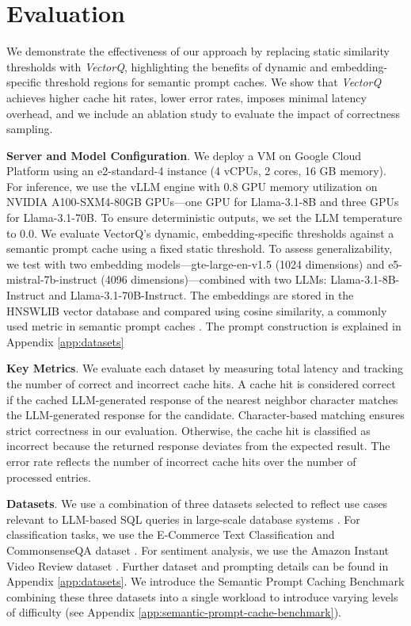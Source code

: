 \section{Evaluation}
\label{experiments}

We demonstrate the effectiveness of our approach by replacing static similarity thresholds with \textit{VectorQ}, highlighting the benefits of dynamic and embedding-specific threshold regions for semantic prompt caches. We show that \textit{VectorQ} achieves higher cache hit rates, lower error rates, imposes minimal latency overhead, and we include an ablation study to evaluate the impact of correctness sampling.

\textbf{Server and Model Configuration}. We deploy a VM on Google Cloud Platform using an e2-standard-4 instance (4 vCPUs, 2 cores, 16 GB memory). For inference, we use the vLLM engine with 0.8 GPU memory utilization on NVIDIA A100-SXM4-80GB GPUs—one GPU for Llama-3.1-8B and three GPUs for Llama-3.1-70B. To ensure deterministic outputs, we set the LLM temperature to 0.0. We evaluate VectorQ's dynamic, embedding-specific thresholds against a semantic prompt cache using a fixed static threshold. To assess generalizability, we test with two embedding models—gte-large-en-v1.5 (1024 dimensions) and e5-mistral-7b-instruct (4096 dimensions)—combined with two LLMs: Llama-3.1-8B-Instruct and Llama-3.1-70B-Instruct. The embeddings are stored in the HNSWLIB vector database \cite{malkov2018efficient} and compared using cosine similarity, a commonly used metric in semantic prompt caches \cite{bang2023gptcache, dasgupta2025wallmartcache}. The prompt construction is explained in Appendix \ref{app:datasets}

\textbf{Key Metrics}. We evaluate each dataset by measuring total latency and tracking the number of correct and incorrect cache hits. A cache hit is considered correct if the cached LLM-generated response of the nearest neighbor character matches the LLM-generated response for the candidate. Character-based matching ensures strict correctness in our evaluation. Otherwise, the cache hit is classified as incorrect because the returned response deviates from the expected result. The error rate reflects the number of incorrect cache hits over the number of processed entries.

\textbf{Datasets}. We use a combination of three datasets selected to reflect use cases relevant to LLM-based SQL queries in large-scale database systems \cite{liu2024optimizing}. For classification tasks, we use the E-Commerce Text Classification \cite{saurabh-2023} and CommonsenseQA dataset \cite{talmor2018commonsenseqa}. For sentiment analysis, we use the Amazon Instant Video Review dataset \cite{ni2019justifying}. Further dataset and prompting details can be found in Appendix \ref{app:datasets}. We introduce the Semantic Prompt Caching Benchmark combining these three datasets into a single workload to introduce varying levels of difficulty (see Appendix \ref{app:semantic-prompt-cache-benchmark}).

